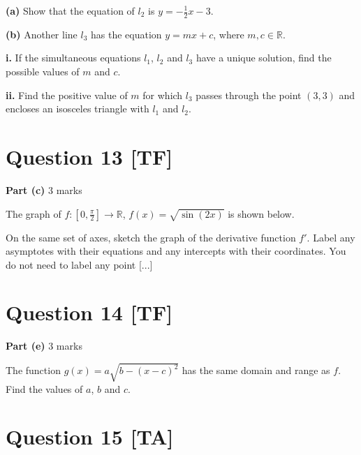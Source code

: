 \documentclass[10pt,a4paper]{article}
\begin{document}
\textbf{(a)} Show that the equation of $l_2$ is $y = -\frac{1}{2}x - 3$.

\vspace{9\baselineskip}

\textbf{(b)} Another line $l_3$ has the equation $y = mx + c$, where $m,c \in \mathbb{R}$.

\textbf{i.} If the simultaneous equations $l_1$, $l_2$ and $l_3$ have a unique solution, find the possible values of $m$ and $c$.

\vspace{9\baselineskip}

\textbf{ii.} Find the positive value of $m$ for which $l_3$ passes through the point $(3,3)$ and encloses an isosceles triangle with $l_1$ and $l_2$.

\vspace{9\baselineskip}

\hrulefill

\section*{Question 13 [TF]}

\textbf{Part (c)} \hfill 3 marks

The graph of $f : \left[0, \frac{\pi}{2}\right] \to \mathbb{R}$, $f(x) = \sqrt{\sin(2x)}$ is shown below.

On the same set of axes, sketch the graph of the derivative function $f'$. Label any asymptotes with their equations and any intercepts with their coordinates. You do not need to label any point [...]

\vspace{9\baselineskip}

\hrulefill

\section*{Question 14 [TF]}

\textbf{Part (e)} \hfill 3 marks

The function $g(x) = a\sqrt{b - (x - c)^2}$ has the same domain and range as $f$. Find the values of $a$, $b$ and $c$.

\vspace{9\baselineskip}

\hrulefill

\section*{Question 15 [TA]}
\end{document}

